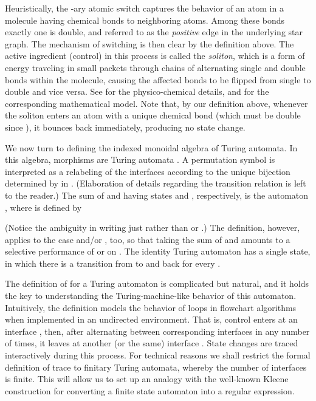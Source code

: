 \documentclass{eptcs}
\begin{document}
  Heuristically, the -ary atomic switch captures the behavior of an atom in a molecule
having  chemical bonds to neighboring atoms. Among these bonds exactly one is double,
and referred to as the {\em positive\/} edge in the underlying star graph. 
The mechanism of switching is then clear by the definition above. The active ingredient
(control) in this process is called the {\em soliton\/}, which is a form of energy traveling
in small packets through chains of alternating single and double bonds within the molecule,
causing the affected bonds to be flipped from single to double and vice versa.
See \cite{dav} for the physico-chemical details, and \cite {das,tcss,det} for the corresponding
mathematical model. Note that, by our definition above, whenever the soliton enters
an atom with a unique chemical bond (which must be double since ), it bounces
back immediately, producing no state change.
\vspp
 
  We now turn to defining the indexed monoidal algebra  of Turing automata.
In this algebra, morphisms are Turing automata
. A permutation symbol  is interpreted as a relabeling of the
interfaces according to the unique bijection  determined by  in .
(Elaboration of details regarding the transition relation is left to the reader.)
The sum of  and  having states  and , respectively, is the automaton
, where  is defined by 

 (Notice the ambiguity in writing just
 rather than  or .) The definition, however, applies to
the case  and/or , too, so that taking the sum of  and  amounts to
a selective performance of  or  on . 
The identity Turing automaton  has a single state, in which there is a
transition from  to  and back for every
.

The definition of  for a Turing automaton  is complicated but
natural, and it holds the key to understanding the Turing-machine-like behavior of
this automaton. Intuitively, the definition models the behavior of loops in
flowchart algorithms \cite{elg} when implemented in an undirected environment.
That is, control enters  at an interface , then, after alternating
between corresponding interfaces in  any number of times, it leaves at another
(or the same) interface . State changes are traced interactively during
this process. For technical reasons we shall restrict the formal definition of
trace to finitary Turing automata, whereby the number of interfaces is finite. This
will allow us to set up an analogy with the well-known Kleene construction
for converting a finite state automaton into a regular expression. 
\end{document}
